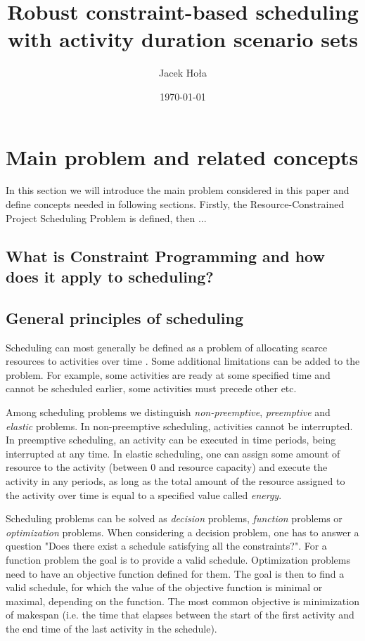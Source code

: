 \documentclass{article}
\theoremstyle{definition}
\begin{document}
 

\title{Robust constraint-based scheduling with activity duration scenario sets}
\author{Jacek Hoła}
\date{\today}
\maketitle
\newpage

\tableofcontents
\newpage

\section{Main problem and related concepts}
In this section we will introduce the main problem considered in this paper and define concepts needed in following sections. Firstly, the Resource-Constrained Project Scheduling Problem is defined, then ...

\subsection{What is Constraint Programming and how does it apply to scheduling?}

\subsection{General principles of scheduling}
Scheduling can most generally be defined as a problem of allocating scarce resources to activities over time \cite{Baker:Introduction}. 
Some additional limitations can be added to the problem. For example, some activities are ready at some specified time and cannot be scheduled earlier, some activities must precede other etc.

Among scheduling problems we distinguish \textit{non-preemptive}, \textit{preemptive} and \textit{elastic} problems. In non-preemptive scheduling, activities cannot be interrupted. In preemptive scheduling, an activity can be executed in time periods, being interrupted at any time. In elastic scheduling, one can assign some amount of resource to the activity (between 0 and resource capacity) and execute the activity in any periods, as long as the total amount of the resource assigned to the activity over time is equal to a specified value called \textit{energy}.

Scheduling problems can be solved as \textit{decision} problems, \textit{function} problems or \textit{optimization} problems. When considering a decision problem, one has to answer a question "Does there exist a schedule satisfying all the constraints?". For a function problem the goal is to provide a valid schedule. Optimization problems need to have an objective function defined for them. The goal is then to find a valid schedule, for which the value of the objective function is minimal or maximal, depending on the function. The most common objective is minimization of makespan (i.e. the time that elapses between the start of the first activity and the end time of the last activity in the schedule).
\end{document}
